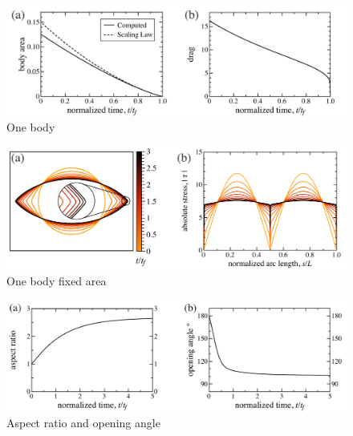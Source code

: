 \documentclass[preprint, 10pt]{elsarticle}
\begin{document}
\begin{figure}%
\begin{center}
\includegraphics[width = 0.8 \textwidth]{./figs/area_drag.pdf}
\caption{One body}
\label{}
\end{center}
\end{figure}





\begin{figure}%
\begin{center}
\includegraphics[width = 0.8 \textwidth]{./figs/fixed_intface.pdf}
\caption{One body fixed area}
\label{}
\end{center}
\end{figure}

\begin{figure}[p]%
\begin{center}
\includegraphics[width = 0.8 \textwidth]{./figs/arangle.pdf}
\caption{Aspect ratio and opening angle}
\label{}
\end{center}
\end{figure}
\end{document}
